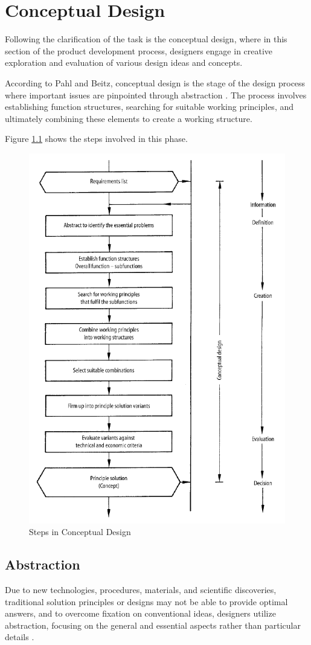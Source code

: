 \chapter{Conceptual Design}
Following the clarification of the task is the conceptual design, where in this section of the product development process, designers engage in creative exploration and evaluation of various design ideas and concepts.

According to Pahl and Beitz, conceptual design is the stage of the design process where important issues are pinpointed through abstraction  \cite[159]{Pahl2007}. The process involves establishing function structures, searching for suitable working principles, and ultimately combining these elements to create a working structure.

Figure \ref{fig:steps-conceptual-design} shows the steps involved in this phase.

\begin{figure}[ht!]
    \centering
    \includegraphics[width=0.7\linewidth]{texs/Part1/chapter3/image/conceptual.png}
    \caption{Steps in Conceptual Design \cite[160]{Pahl2007}}
    \label{fig:steps-conceptual-design}
\end{figure}


\section{Abstraction}
Due to new technologies, procedures, materials, and scientific discoveries, traditional solution principles or designs may not be able to provide optimal answers, and to overcome fixation on conventional ideas, designers utilize abstraction, focusing on the general and essential aspects rather than particular details \cite[161]{Pahl2007}.

